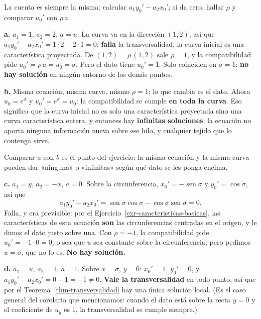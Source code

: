 \documentclass[
  spanish,
  a4paper,
]{scrbook}
\theoremstyle{definition}
\theoremstyle{plain}
\theoremstyle{definition}
\theoremstyle{plain}
\theoremstyle{definition}
\theoremstyle{remark}
\begin{document}
\begin{tcolorbox}[enhanced jigsaw, arc=.35mm, bottomrule=.15mm, bottomtitle=1mm, breakable, colback=white, colbacktitle=quarto-callout-tip-color!10!white, colframe=quarto-callout-tip-color-frame, coltitle=black, left=2mm, leftrule=.75mm, opacityback=0, opacitybacktitle=0.6, rightrule=.15mm, title=\textcolor{quarto-callout-tip-color}{\faLightbulb}\hspace{0.5em}{Solución}, titlerule=0mm, toprule=.15mm, toptitle=1mm]

La cuenta es siempre la misma: calcular \(a_1y_0' - a_2x_0'\); si da
cero, hallar \(\rho\) y comparar \(u_0'\) con \(\rho\,a\).

\textbf{a.} \(a_1=1\), \(a_2=2\), \(a=u\). La curva va en la dirección
\((1,2)\), así que \(a_1y_0' - a_2x_0' = 1\cdot 2 - 2\cdot 1 = 0\):
\textbf{falla} la transversalidad, la curva inicial es una
característica proyectada. De \((1,2) = \rho\,(1,2)\) sale \(\rho = 1\),
y la compatibilidad pide \(u_0' = \rho\,a = u_0 = \sigma\). Pero el dato
tiene \(u_0' = 1\). Solo coinciden en \(\sigma=1\): \textbf{no hay
solución} en ningún entorno de los demás puntos.

\textbf{b.} Misma ecuación, misma curva, mismo \(\rho=1\); lo que cambia
es el dato. Ahora \(u_0 = e^{\sigma}\) y \(u_0' = e^{\sigma} = u_0\): la
compatibilidad se cumple \textbf{en toda la curva}. Eso significa que la
curva inicial no es solo una característica proyectada sino una curva
característica entera, y entonces hay \textbf{infinitas soluciones}: la
ecuación no aporta ninguna información nueva sobre ese hilo, y cualquier
tejido que lo contenga sirve.

Comparar \(a\) con \(b\) es el punto del ejercicio: la misma ecuación y
la misma curva pueden dar «ninguna» o «infinitas» según qué dato se les
ponga encima.

\textbf{c.} \(a_1=y\), \(a_2=-x\), \(a=0\). Sobre la circunferencia,
\(x_0'=-\operatorname{sen}\sigma\) y \(y_0'=\cos\sigma\), así que
\[a_1y_0' - a_2x_0' = \operatorname{sen}\sigma\cos\sigma - \cos\sigma\operatorname{sen}\sigma = 0 .\]
Falla, y era previsible: por el
Ejercicio~\ref{exr-caracteristicas-basicas}, las características de esta
ecuación \textbf{son} las circunferencias centradas en el origen, y le
dimos el dato justo sobre una. Con \(\rho = -1\), la compatibilidad pide
\(u_0' = -1\cdot 0 = 0\), o sea que \(u\) sea constante sobre la
circunferencia; pero pedimos \(u=\sigma\), que no lo es. \textbf{No hay
solución.}

\textbf{d.} \(a_1=u\), \(a_2=1\), \(a=1\). Sobre \(x=\sigma\), \(y=0\):
\(x_0'=1\), \(y_0'=0\), y \(a_1y_0' - a_2x_0' = 0 - 1 = -1 \neq 0\).
\textbf{Vale la transversalidad} en todo punto, así que por el
Teorema~\ref{thm-transversalidad} hay una única solución local. (Es el
caso general del corolario que mencionamos: cuando el dato está sobre la
recta \(y=0\) y el coeficiente de \(u_y\) es \(1\), la transversalidad
se cumple siempre.)

\end{tcolorbox}
\end{document}
